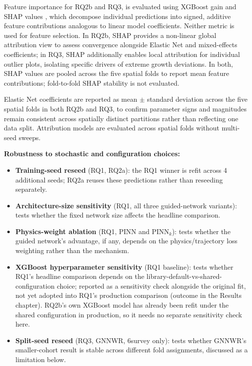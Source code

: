 \documentclass[logo,msc,ai]{infthesis}           %
\begin{document}
Feature importance for RQ2b and RQ3, is evaluated using XGBoost gain and SHAP values \cite{lundberg2017unified}, which decompose individual predictions into signed, additive feature contributions analogous to linear model coefficients. Neither metric is used for feature selection. %
In RQ2b, SHAP provides a non-linear global attribution view to assess convergence alongside Elastic Net and mixed-effects coefficients; in RQ3, SHAP additionally enables local attribution for individual outlier plots, isolating specific drivers of extreme growth deviations. In both, SHAP values are pooled across the five spatial folds to report mean feature contributions; fold-to-fold SHAP stability is not evaluated.

Elastic Net coefficients are reported as mean $\pm$ standard deviation across the five spatial folds in both RQ2b and RQ3, to confirm parameter signs and magnitudes remain consistent across spatially distinct partitions rather than reflecting one data split. Attribution models are evaluated across spatial folds without multi-seed sweeps.

\textbf{Robustness to stochastic and configuration choices:} %
\begin{itemize}
\setlength\itemsep{0pt}
\item \textbf{Training-seed reseed} (RQ1, RQ2a): the RQ1 winner is refit across 4 additional seeds; RQ2a reuses these predictions rather than reseeding separately.
\item \textbf{Architecture-size sensitivity} (RQ1, all three guided-network variants): tests whether the fixed network size affects the headline comparison.
\item \textbf{Physics-weight ablation} (RQ1, PINN and PINN$_k$): tests whether the guided network's advantage, if any, depends on the physics/trajectory loss weighting rather than the mechanism.
\item \textbf{XGBoost hyperparameter sensitivity} (RQ1 baseline): tests whether RQ1's headline comparison depends on the library-default-vs-shared-configuration choice; reported as a sensitivity check alongside the original fit, not yet adopted into RQ1's production comparison (outcome in the Results chapter). RQ2b's own XGBoost model has already been refit under the shared configuration in production, so it needs no separate sensitivity check here.
\item \textbf{Split-seed reseed} (RQ3, GNNWR, 6survey only): tests whether GNNWR's smaller-cohort result is stable across different fold assignments, discussed as a limitation below.
\end{itemize} 
\end{document}
